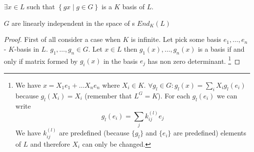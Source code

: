 \begin{theorem}
  $\exists x \in L$ such that
  $\left\{gx \mid g \in G\right\}$ is a $K$ basis of $L$.

  $G$ are
  linearly independent in the space of s
  $End_{K}\left(L\right)$
  \label{thm:normalbase}
  \begin{proof}
    First of all consider a case when $K$ is infinite. Let pick some
    basis $e_1, \dots, e_n$ - $K$-basis in $L$. $g_1, \dots, g_n \in
    G$. Let $x \in L$ then $g_1\left(x\right), \dots,
    g_n\left(x\right)$ is a basis if and only if matrix formed by
    $g_i\left(x\right)$ in the basis $e_j$ has non zero
    determinant.
    \footnote{
      We have $x = X_1 e_1 + \dots X_n e_n$ where $X_i \in K$.
      $\forall g_l \in G: g_l(x) = \sum_i X_i g_l(e_i)$
      because $g_l(X_i) = X_i$ (remember that $L^G = K$).
      For each $g_l(e_i)$ we can write
      \begin{equation}
        g_l(e_i) = \sum_j k_{ij}^{(l)} e_j
        \label{eq:lec8_note_basis2}
      \end{equation}      
      We have $k_{ij}^{(l)}$ are predefined
      (because $\{g_l\}$ and $\{e_i\}$ are predefined)
      elements of $L$ and therefore $X_i$ can only be changed.

}
\end{proof}
\end{theorem}
